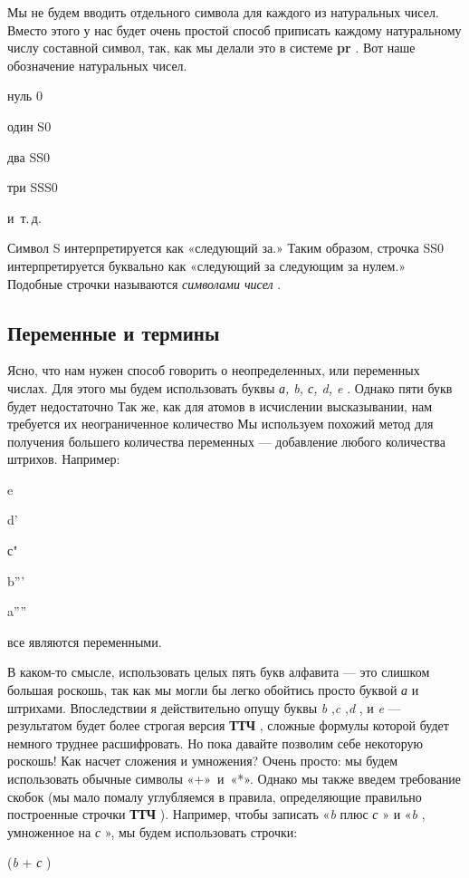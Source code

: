 \documentclass[../main.tex]{subfiles}
\begin{document}
Мы не будем вводить отдельного символа для каждого из натуральных чисел. Вместо этого у нас будет очень простой способ приписать каждому натуральному числу составной символ, так, как мы делали это в системе \textbf{pr} . Вот наше обозначение натуральных чисел.

нуль 0

один S0

два SS0

три SSS0

и~т.\,д.

Символ S интерпретируется как «следующий за.» Таким образом, строчка SS0 интерпретируется буквально как «следующий за следующим за нулем.» Подобные строчки называются \emph{символами чисел} .


\subsection{Переменные и термины}

Ясно, что нам нужен способ говорить о неопределенных, или переменных числах. Для этого мы будем использовать буквы \emph{а, b, с, d, e} . Однако пяти букв будет недостаточно Так же, как для атомов в исчислении высказывании, нам требуется их неограниченное количество Мы используем похожий метод для получения большего количества переменных --- добавление любого количества штрихов. Например:

e

d'

с"

b'''

a''''

все являются переменными.

В каком-то смысле, использовать целых пять букв алфавита --- это слишком большая роскошь, так как мы могли бы легко обойтись просто буквой \emph{а} и штрихами. Впоследствии я действительно опущу буквы \emph{b} ,\emph{c} ,\emph{d} , и \emph{e} --- результатом будет более строгая версия \textbf{ТТЧ} , сложные формулы которой будет немного труднее расшифровать. Но пока давайте позволим себе некоторую роскошь! Как насчет сложения и умножения? Очень просто: мы будем использовать обычные символы «+»~и~«*». Однако мы также введем требование скобок (мы мало помалу углубляемся в правила, определяющие правильно построенные строчки \textbf{ТТЧ} ). Например, чтобы записать «\emph{b} плюс \emph{с} » и «\emph{b} , умноженное на \emph{с} », мы будем использовать строчки:

(\emph{b} + \emph{с} )
\end{document}
